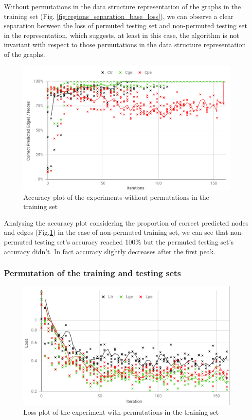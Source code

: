 Without permutations in the data structure representation of the graphs in the training set (Fig. \ref{fig:regions_separation_base_loss}), we can observe a clear separation between the loss of permuted testing set and non-permuted testing set in the representation, which suggests, at least in this case, the algorithm is not invariant with respect to those permutations in the data structure representation of the graphs.

\begin{figure}[H]
    \centering
    \includegraphics[width=.9\linewidth]
    {fig/content/results/shapes/base/correct.png}
    \caption{Accuracy plot of the experiments without permutations in the training set}
    \label{fig:regions_separation_base_accuracy}
\end{figure}

Analysing the accuracy plot considering the proportion of correct predicted nodes and edges (Fig.\ref{fig:regions_separation_base_accuracy}) in the case of non-permuted training set, we can see that non-permuted testing set's accuracy reached 100\% but the permuted testing set's accuracy didn't. In fact accuracy slightly decreases after the first peak.

\subsubsection {Permutation of the training and testing sets}

\begin{figure}[H]
    \centering
    \includegraphics[width=.9\linewidth]
    {fig/content/results/shapes/permuted_training/loss.png}
    \caption{Loss plot of the experiment with permutations in the training set}
    \label{fig:regions_separation_permuting_training_loss}
\end{figure}

